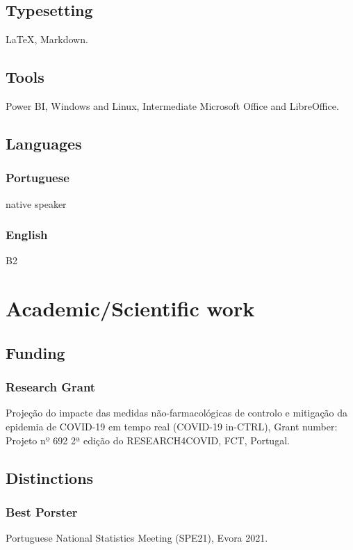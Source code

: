 \documentclass[11pt,oneside,a4paper,titlepage]{article}
\begin{document}
\subsection{  Typesetting}
 \quad \LaTeX, Markdown.

\subsection{  Tools}
 \quad Power BI, Windows and Linux, Intermediate Microsoft Office  and LibreOffice.

\subsection{  Languages}
\subsubsection{Portuguese}
native speaker
\subsubsection{English}
B2

\section{Academic/Scientific work}
\subsection{  Funding}
\subsubsection{Research Grant}
Projeção do impacte das medidas não-farmacológicas de controlo e mitigação da epidemia de COVID-19 em tempo real (COVID-19 in-CTRL),
Grant number: Projeto nº 692 2ª edição do RESEARCH4COVID, FCT, Portugal.

%
\subsection{  Distinctions}
\subsubsection{Best Porster}
Portuguese National Statistics Meeting (SPE21), Evora 2021.

%
\end{document}
